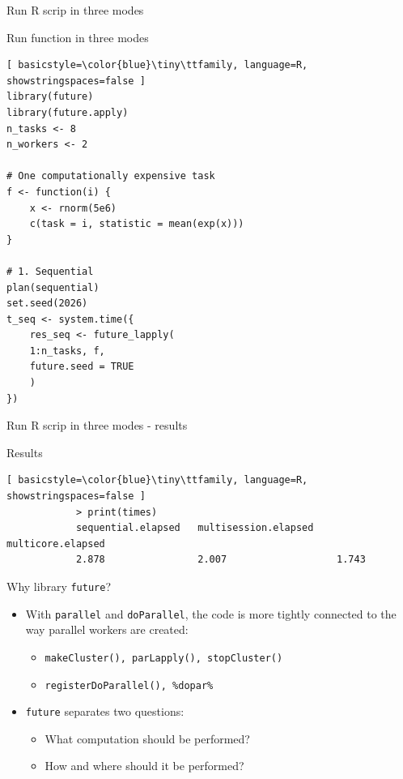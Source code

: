 \documentclass[compress,xcolor=table]{beamer}
\begin{document}
\begin{frame}[fragile]{Run R scrip in three modes}
	\hfill \href{https://github.com/janezpovh/parallel-R-nov-26/blob/main/code/Rscripts_part3_future.R} {
	} 
		\vspace{-1mm} \begin{block} 
	{Run function in three modes} 
	\tiny \begin{lstlisting}[ basicstyle=\color{blue}\tiny\ttfamily, language=R, showstringspaces=false ] 
library(future)
library(future.apply)
n_tasks <- 8
n_workers <- 2

# One computationally expensive task
f <- function(i) {
	x <- rnorm(5e6)
	c(task = i, statistic = mean(exp(x)))
}

# 1. Sequential
plan(sequential)
set.seed(2026)
t_seq <- system.time({
	res_seq <- future_lapply(
	1:n_tasks, f,
	future.seed = TRUE
	)
})
	\end{lstlisting} 
\end{block} 
	
\end{frame}




\begin{frame}[fragile]{Run R scrip in three modes - results}
\begin{block}{Results} 
 \begin{lstlisting}[ basicstyle=\color{blue}\tiny\ttfamily, language=R, showstringspaces=false ] 
			> print(times)
			sequential.elapsed   multisession.elapsed    multicore.elapsed 
			2.878                2.007                   1.743 
\end{lstlisting} 
\end{block} 
	
\end{frame}




\begin{frame}{Why library \texttt{future}?} 
	\small 
	\begin{itemize}
		\item With \texttt{parallel} and \texttt{doParallel}, the code is more tightly connected to the way parallel workers are created: 
		\begin{itemize} 
			\item \texttt{makeCluster(), parLapply(), stopCluster()} 
			\item \texttt{registerDoParallel(), \%dopar\%} 
		\end{itemize} 
		\item \texttt{future} separates two questions: 
		\begin{itemize} 
				\item {What} computation should be performed? 
				\item {How and where} should it be performed? 
		\end{itemize} 
	\end{itemize} 
\end{frame}
\end{document}
